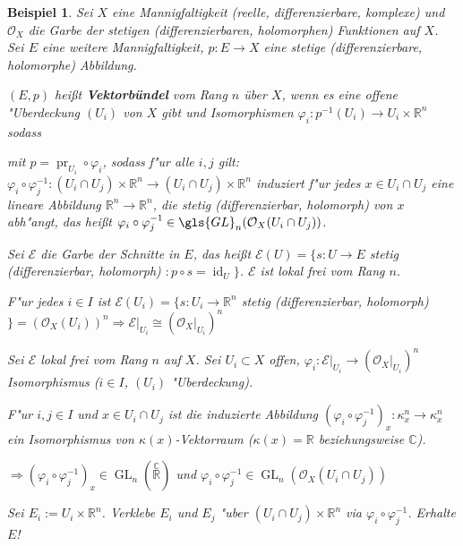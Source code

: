 \documentclass[paper = A4, fontsize=12pt, numbers=noendperiod, chapterprefix=true]{scrbook}
\theoremstyle{break}
\newtheorem{Bsp}[Def]{Beispiel}
\theoremstyle{nonumberbreak}
\theoremstyle{nonumberplain}
\newcommand{\emp}[1]{\textbf{\emph{#1}}}
\newcommand{\defterm}[1]{{\index{#1}}\emp{#1}}
\newcommand{\schraffiert}{\ensuremath{\nicefrac{\nicefrac{}{}}{\nicefrac{}{}}}}
\DeclareMathOperator{\GL}{GL}
\DeclareMathOperator{\id}{id}
\DeclareMathOperator{\pr}{pr}
\newcommand{\C}{\mathbb{C}}
\newcommand{\R}{\mathbb{R}}
\newcommand{\calE}{\mathcal{E}}
\newcommand{\calO}{\mathcal{O}}
\newcommand{\X}{\times}
\begin{document}
\begin{Bsp}\label{10.3}
Sei $X$ eine Mannigfaltigkeit (reelle, differenzierbare, komplexe) und $\calO_X$ die Garbe der stetigen (differenzierbaren, holomorphen) Funktionen auf $X$. Sei $E$ eine weitere Mannigfaltigkeit, $p: E \to X$ eine stetige (differenzierbare, holomorphe) Abbildung.

$(E,p)$ hei\ss t \defterm{Vektorb\"undel} vom Rang $n$ \"uber $X$, wenn es eine offene "Uberdeckung $(U_i)$ von $X$ gibt und Isomorphismen $\varphi_i: p^{-1}(U_i) \to U_i \X \R^n$ sodass
	\begin{center}\end{center}
mit $p = \pr_{U_i} \circ \varphi_i$, sodass f"ur alle $i,j$ gilt: $\varphi_i \circ \varphi_j^{-1}: (U_i \cap U_j) \X \R^n \to (U_i \cap U_j) \X \R^n$ induziert f"ur jedes $x \in U_i \cap U_j$ eine lineare Abbildung $\R^n \to \R^n$, die stetig (differenzierbar, holomorph) von $x$ abh"angt, das hei\ss t $\varphi_i \circ \varphi_j^{-1} \in \gls{GL}_n (\calO_X(U_i \cap U_j))$.

Sei $\calE$ die Garbe der Schnitte in $E$, das hei\ss t $\calE(U) = \{ s: U \to E$ stetig (differenzierbar, holomorph) $: p \circ s = \id_U\}$. $\calE$ ist lokal frei vom Rang $n$.
\begin{description}[\setlabelstyle{\itshape}]
\item[Denn:]
	F"ur jedes $i \in I$ ist $\calE(U_i) = \{s: U_i \to \R^n$ stetig (differenzierbar, holomorph)$\} = (\calO_X(U_i))^n \Rightarrow \calE|_{U_i} \cong (\calO_X|_{U_i})^n$
\item[Umgekehrt:]
	Sei $\calE$ lokal frei vom Rang $n$ auf $X$. Sei $U_i \subset X$ offen, $\varphi_i: \calE|_{U_i} \to (\calO_X|_{U_i})^n$ Isomorphismus ($i \in I$, $(U_i)$ "Uberdeckung).
	
	F"ur $i,j \in I$ und $x \in U_i \cap U_j$ ist die induzierte Abbildung $(\varphi_i \circ \varphi_j^{-1})_x: \kappa_x^n \to \kappa_x^n$ ein Isomorphismus von $\kappa(x)$-Vektorraum ($\kappa(x) = \R$ beziehungsweise $\C$).
	
	$\Rightarrow (\varphi_i \circ \varphi_j^{-1})_x \in \GL_n(\overset{\C}{\R})$ und $\varphi_i \circ \varphi_j^{-1} \in \GL_n (\calO_X(U_i \cap U_j))$
	
	Sei $E_i := U_i \X \R^n$. Verklebe $E_i$ und $E_j$ "uber $(U_i \cap U_j) \X \R^n$ via $\varphi_i \circ \varphi_j^{-1}$. Erhalte $E$!
\end{description}\end{Bsp}
\end{document}
